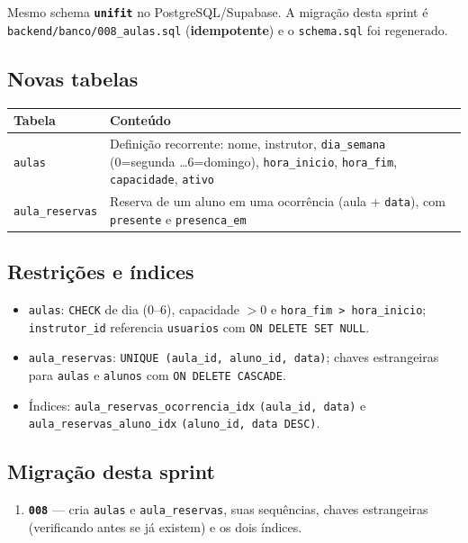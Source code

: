 \documentclass[11pt,a4paper]{article}
\newcommand{\cod}[1]{\texttt{#1}}
\begin{document}
Mesmo schema \textbf{\cod{unifit}} no PostgreSQL/Supabase. A migração desta sprint é
\cod{backend/banco/008\_aulas.sql} (\textbf{idempotente}) e o \cod{schema.sql} foi regenerado.

\subsection{Novas tabelas}

\begin{xltabular}{\textwidth}{l Y}
  \toprule
  \textbf{Tabela} & \textbf{Conteúdo} \\
  \midrule
  \endhead
  \cod{aulas}         & Definição recorrente: nome, instrutor, \cod{dia\_semana} (0=segunda \ldots 6=domingo),
                        \cod{hora\_inicio}, \cod{hora\_fim}, \cod{capacidade}, \cod{ativo} \\
  \cod{aula\_reservas} & Reserva de um aluno em uma ocorrência (aula + \cod{data}), com \cod{presente} e \cod{presenca\_em} \\
  \bottomrule
\end{xltabular}

\subsection{Restrições e índices}

\begin{itemize}
  \item \cod{aulas}: \cod{CHECK} de dia (0--6), capacidade $> 0$ e \cod{hora\_fim > hora\_inicio};
        \cod{instrutor\_id} referencia \cod{usuarios} com \cod{ON DELETE SET NULL}.
  \item \cod{aula\_reservas}: \cod{UNIQUE (aula\_id, aluno\_id, data)}; chaves estrangeiras para
        \cod{aulas} e \cod{alunos} com \cod{ON DELETE CASCADE}.
  \item Índices: \cod{aula\_reservas\_ocorrencia\_idx} \cod{(aula\_id, data)} e
        \cod{aula\_reservas\_aluno\_idx} \cod{(aluno\_id, data DESC)}.
\end{itemize}

\subsection{Migração desta sprint}

\begin{enumerate}
  \item \textbf{\cod{008}} --- cria \cod{aulas} e \cod{aula\_reservas}, suas sequências, chaves
        estrangeiras (verificando antes se já existem) e os dois índices.
\end{enumerate}
\end{document}
